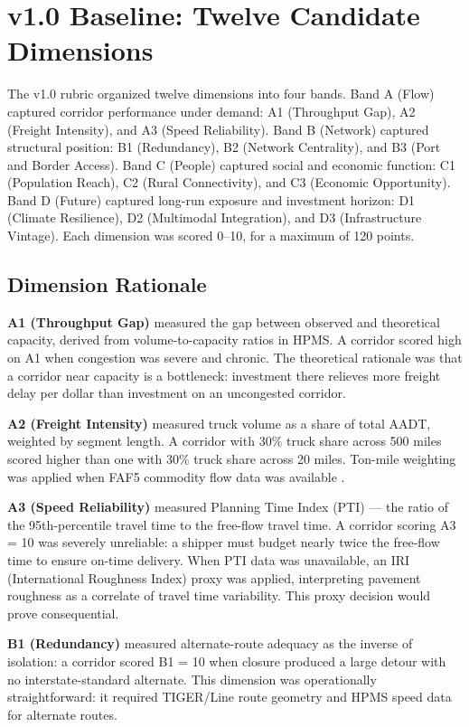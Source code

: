 \section{v1.0 Baseline: Twelve Candidate Dimensions}
\label{sec:v10-baseline}

The v1.0 rubric organized twelve dimensions into four bands. Band A (Flow) captured corridor performance under demand: A1 (Throughput Gap), A2 (Freight Intensity), and A3 (Speed Reliability). Band B (Network) captured structural position: B1 (Redundancy), B2 (Network Centrality), and B3 (Port and Border Access). Band C (People) captured social and economic function: C1 (Population Reach), C2 (Rural Connectivity), and C3 (Economic Opportunity). Band D (Future) captured long-run exposure and investment horizon: D1 (Climate Resilience), D2 (Multimodal Integration), and D3 (Infrastructure Vintage). Each dimension was scored 0--10, for a maximum of 120 points.

\subsection{Dimension Rationale}

\textbf{A1 (Throughput Gap)} measured the gap between observed and theoretical capacity, derived from volume-to-capacity ratios in HPMS. A corridor scored high on A1 when congestion was severe and chronic. The theoretical rationale was that a corridor near capacity is a bottleneck: investment there relieves more freight delay per dollar than investment on an uncongested corridor.

\textbf{A2 (Freight Intensity)} measured truck volume as a share of total AADT, weighted by segment length. A corridor with 30\% truck share across 500 miles scored higher than one with 30\% truck share across 20 miles. Ton-mile weighting was applied when FAF5 commodity flow data was available \citep{FAF5_2022}.

\textbf{A3 (Speed Reliability)} measured Planning Time Index (PTI) --- the ratio of the 95th-percentile travel time to the free-flow travel time. A corridor scoring A3 = 10 was severely unreliable: a shipper must budget nearly twice the free-flow time to ensure on-time delivery. When PTI data was unavailable, an IRI (International Roughness Index) proxy was applied, interpreting pavement roughness as a correlate of travel time variability. This proxy decision would prove consequential.

\textbf{B1 (Redundancy)} measured alternate-route adequacy as the inverse of isolation: a corridor scored B1 = 10 when closure produced a large detour with no interstate-standard alternate. This dimension was operationally straightforward: it required TIGER/Line route geometry and HPMS speed data for alternate routes.

